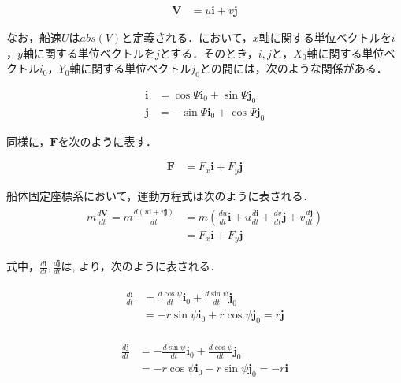 \begin{align}
    \boldsymbol{V} &= u \boldsymbol{i} + v \boldsymbol{j} \label{eq:2-3}
\end{align}

なお，船速$U$は$abs(V)$と定義される．において，$x$軸に関する単位ベクトルを$i$，$y$軸に関する単位ベクトルを$j$とする．そのとき，$i,j$と，$X_0$軸に関する単位ベクトル$i_0$，$Y_0$軸に関する単位ベクトル$j_0$との間には，次のような関係がある．

\begin{align}
    \boldsymbol{i} &= \cos{\Psi} \boldsymbol{i}_0 + \sin{\Psi} \boldsymbol{j}_0 \label{eq:2-4}\\
    \boldsymbol{j} &= - \sin{\Psi} \boldsymbol{i}_0 + \cos{\Psi} \boldsymbol{j}_0 \label{eq:2-5}
\end{align}

同様に，$\boldsymbol{F}$を次のように表す．

\begin{align}
    \boldsymbol{F} &= F_x \boldsymbol{i} + F_y \boldsymbol{j} \label{eq:2-6}
\end{align}

船体固定座標系において，運動方程式は次のように表される．
\begin{align}
    \begin{split}
    m \frac{d \boldsymbol{V}}{d t}=m \frac{d(u \boldsymbol{i}+v \boldsymbol{j})}{d t} &=m\left(\frac{d u}{d t} \boldsymbol{i}+u \frac{d \boldsymbol{i}}{d t}+\frac{d v}{d t} \boldsymbol{j}+v \frac{d \boldsymbol{j}}{d t}\right) \\
    &=F_{x} \boldsymbol{i}+F_{y} \boldsymbol{j} \label{eq:2-7}
    \end{split}
\end{align}

式中，$\frac{d \boldsymbol{i}}{d t},\frac{d \boldsymbol{j}}{d t}$は, より，次のように表される．

\begin{align}
    \begin{split}
        \frac{d \boldsymbol{i}}{d t}&=\frac{d \cos \psi}{d t} \boldsymbol{i}_{0}+\frac{d \sin \psi}{d t} \boldsymbol{j}_{0} \\
        &=-r \sin \psi \boldsymbol{i}_{0}+r \cos \psi \boldsymbol{j}_{0}=r \boldsymbol{j} \label{eq:2-8}
    \end{split}
\end{align}

\begin{align}
    \begin{split}
        \frac{d \boldsymbol{j}}{d t}&=-\frac{d \sin \psi}{d t} \boldsymbol{i}_{0}+\frac{d \cos \psi}{d t} \boldsymbol{j}_{0} \\
        &=-r \cos \psi \boldsymbol{i}_{0}-r \sin \psi \boldsymbol{j}_{0}=-r \boldsymbol{i} \label{eq:2-9}
    \end{split}
\end{align}

